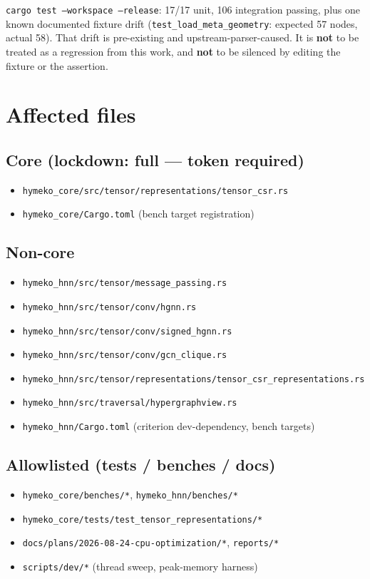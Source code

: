 \documentclass[11pt,a4paper]{article}
\begin{document}
\texttt{cargo test --workspace --release}: 17/17 unit, 106 integration
passing, plus one known documented fixture drift
(\texttt{test\_load\_meta\_geometry}: expected 57 nodes, actual 58). That
drift is pre-existing and upstream-parser-caused. It is \textbf{not} to be
treated as a regression from this work, and \textbf{not} to be silenced by
editing the fixture or the assertion.

\section{Affected files}

\subsection*{Core (lockdown: full --- token required)}
\begin{itemize}
  \item \texttt{hymeko\_core/src/tensor/representations/tensor\_csr.rs}
  \item \texttt{hymeko\_core/Cargo.toml} (bench target registration)
\end{itemize}

\subsection*{Non-core}
\begin{itemize}
  \item \texttt{hymeko\_hnn/src/tensor/message\_passing.rs}
  \item \texttt{hymeko\_hnn/src/tensor/conv/hgnn.rs}
  \item \texttt{hymeko\_hnn/src/tensor/conv/signed\_hgnn.rs}
  \item \texttt{hymeko\_hnn/src/tensor/conv/gcn\_clique.rs}
  \item \texttt{hymeko\_hnn/src/tensor/representations/tensor\_csr\_representations.rs}
  \item \texttt{hymeko\_hnn/src/traversal/hypergraphview.rs}
  \item \texttt{hymeko\_hnn/Cargo.toml} (criterion dev-dependency, bench targets)
\end{itemize}

\subsection*{Allowlisted (tests / benches / docs)}
\begin{itemize}
  \item \texttt{hymeko\_core/benches/*}, \texttt{hymeko\_hnn/benches/*}
  \item \texttt{hymeko\_core/tests/test\_tensor\_representations/*}
  \item \texttt{docs/plans/2026-08-24-cpu-optimization/*}, \texttt{reports/*}
  \item \texttt{scripts/dev/*} (thread sweep, peak-memory harness)
\end{itemize}
\end{document}
